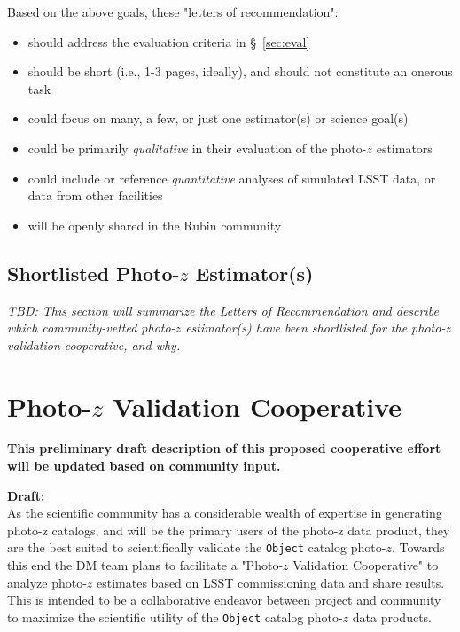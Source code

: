 \documentclass[DM,lsstdraft,toc]{lsstdoc}
\begin{document}
Based on the above goals, these "letters of recommendation":
\begin{itemize}
\item should address the evaluation criteria in  \S~\ref{sec:eval}
\item should be short (i.e., 1-3 pages, ideally), and should not constitute an onerous task
\item could focus on many, a few, or just one estimator(s) or science goal(s)
\item could be primarily {\it qualitative} in their evaluation of the photo-$z$ estimators
\item could include or reference {\it quantitative} analyses of simulated LSST data, or data from other facilities
\item will be openly shared in the Rubin community
\end{itemize}


\subsection{Shortlisted Photo-$z$ Estimator(s)} \label{ssec:lor_choice}

\textit{TBD: This section will summarize the Letters of Recommendation and describe which community-vetted photo-$z$ estimator(s) have been shortlisted for the photo-$z$ validation cooperative, and why.}


\clearpage
\section{Photo-$z$ Validation Cooperative}\label{sec:pzcoop}

\textbf{This preliminary draft description of this proposed cooperative effort will be updated based on community input.}

\textbf{Draft:} \\
As the scientific community has a considerable wealth of expertise in generating photo-z catalogs, and will be the primary users of the photo-z data product, they are the best suited to scientifically validate the {\tt Object} catalog photo-$z$.
Towards this end the DM team plans to facilitate a "Photo-$z$ Validation Cooperative" to analyze photo-$z$ estimates based on LSST commissioning data and share results.
This is intended to be a collaborative endeavor between project and community to maximize the scientific utility of the {\tt Object} catalog photo-$z$ data products.
\end{document}
